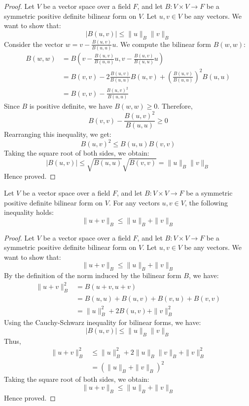 \documentclass[openany]{book}
\begin{document}
\begin{proof}
Let $V$ be a vector space over a field $F$, and let $B: V \times V \to F$ be a symmetric positive definite bilinear form on $V$. Let $u, v \in V$ be any vectors. We want to show that:
$$|B(u, v)| \leq \|u\|_B \|v\|_B$$
Consider the vector $w = v - \frac{B(u, v)}{B(u, u)} u$. We compute the bilinear form $B(w, w)$:
\[\begin{aligned}
B(w, w) &= B\left(v - \frac{B(u, v)}{B(u, u)} u, v - \frac{B(u, v)}{B(u, u)} u\right) \\
&= B(v, v) - 2 \frac{B(u, v)}{B(u, u)} B(u, v) + \left(\frac{B(u, v)}{B(u, u)}\right)^2 B(u, u) \\
&= B(v, v) - \frac{B(u, v)^2}{B(u, u)}
\end{aligned}\]
Since $B$ is positive definite, we have $B(w, w) \geq 0$. Therefore,
$$B(v, v) - \frac{B(u, v)^2}{B(u, u)} \geq 0$$
Rearranging this inequality, we get:
$$B(u, v)^2 \leq B(u, u) B(v, v)$$
Taking the square root of both sides, we obtain:
$$|B(u, v)| \leq \sqrt{B(u, u)} \sqrt{B(v, v)} = \|u\|_B \|v\|_B$$
Hence proved.
\end{proof}
\begin{mytheorem}
Let $V$ be a vector space over a field $F$, and let $B: V \times V \to F$ be a symmetric positive definite bilinear form on $V$. For any vectors $u, v \in V$, the following inequality holds:
$$\|u + v\|_B \leq \|u\|_B + \|v\|_B$$
\end{mytheorem}
\begin{proof}
Let $V$ be a vector space over a field $F$, and let $B: V \times V \to F$ be a symmetric positive definite bilinear form on $V$. Let $u, v \in V$ be any vectors. We want to show that:
$$\|u + v\|_B \leq \|u\|_B + \|v\|_B$$
By the definition of the norm induced by the bilinear form $B$, we have:
\[\begin{aligned}
\|u + v\|_B^2 &= B(u + v, u + v) \\
&= B(u, u) + B(u, v) + B(v, u) + B(v, v) \\
&= \|u\|_B^2 + 2B(u, v) + \|v\|_B^2
\end{aligned}\]
Using the Cauchy-Schwarz inequality for bilinear forms, we have:
$$|B(u, v)| \leq \|u\|_B \|v\|_B$$
Thus,
\[\begin{aligned}
\|u + v\|_B^2 &\leq \|u\|_B^2 + 2\|u\|_B \|v\|_B + \|v\|_B^2 \\
&= (\|u\|_B + \|v\|_B)^2
\end{aligned}\]
Taking the square root of both sides, we obtain:
$$\|u + v\|_B \leq \|u\|_B + \|v\|_B$$
Hence proved. 
\end{proof}
\end{document}

